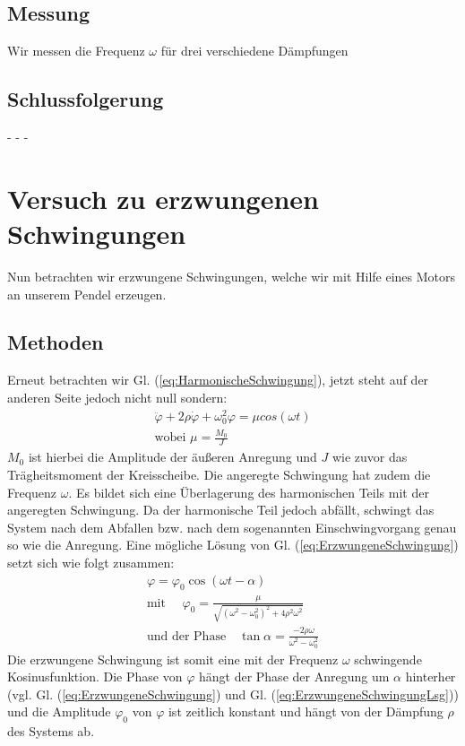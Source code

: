 \documentclass[11pt,a4paper,titlepage, ngerman]{article}
\newcommand{\refeq}[1]{Gl. (\ref{eq:#1})}
\begin{document}
		\subsection*{Messung}
		
			Wir messen die Frequenz $\omega$ für drei verschiedene Dämpfungen
			
		\subsection*{Schlussfolgerung}
			
			- - -
			
	\section{Versuch zu erzwungenen Schwingungen}
	
		Nun betrachten wir erzwungene Schwingungen, welche wir mit Hilfe eines Motors an unserem Pendel erzeugen.
			
		\subsection*{Methoden}
			
			Erneut betrachten wir \refeq{HarmonischeSchwingung}, jetzt steht auf der anderen Seite jedoch nicht null sondern:
			\begin{align}
				\ddot{\varphi}+2\rho\dot{\varphi}+\omega_0^2\varphi= \mu cos(\omega t) \label{eq:ErzwungeneSchwingung}\\
				\text{wobei } \mu = \frac{M_0}{J}
			\end{align}
			$M_0$ ist hierbei die Amplitude der äußeren Anregung und $J$ wie zuvor das Trägheitsmoment der Kreisscheibe. Die angeregte Schwingung hat zudem die Frequenz $\omega$.
			Es bildet sich eine Überlagerung des harmonischen Teils mit der angeregten Schwingung. Da der harmonische Teil jedoch abfällt, schwingt das System nach dem Abfallen bzw. nach dem sogenannten Einschwingvorgang genau so wie die Anregung.
			Eine mögliche Lösung von \refeq{ErzwungeneSchwingung} setzt sich wie folgt zusammen:
			\begin{align}
				\varphi = \varphi_0 \cos{(\omega t-\alpha)} \label{eq:ErzwungeneSchwingungLsg}\\
				\text{mit } \quad \varphi_0 = \frac{\mu}{\sqrt{(\omega^2-\omega_0^2)^2+4\rho^2\omega^2}} \label{eq:ErzwungeneSchwingungAmp}\\
				\text{und der Phase} \quad \tan{\alpha} = \frac{-2\rho\omega}{\omega^2-\omega_0^2}
			\end{align}
			Die erzwungene Schwingung ist somit eine mit der Frequenz $\omega$ schwingende Kosinusfunktion. Die Phase von $\varphi$ hängt der Phase der Anregung um $\alpha$ hinterher (vgl. \refeq{ErzwungeneSchwingung} und \refeq{ErzwungeneSchwingungLsg}) und die Amplitude $\varphi_0$ von $\varphi$ ist zeitlich konstant und hängt von der Dämpfung $\rho$ des Systems ab.
			
\end{document}
